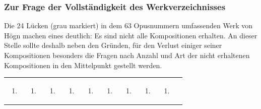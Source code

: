 \documentclass[a4paper]{article}
\begin{document}
\subsubsection{Zur Frage der Vollständigkeit des Werkverzeichnisses}
\label{bkm:Ref98427627}\hypertarget{RefHeadingToc100333741}{}Die 24
Lücken (grau markiert) in dem 63 Opusnummern umfassenden Werk von Högn
machen eines deutlich: Es sind nicht alle Kompositionen erhalten. An
dieser Stelle sollte deshalb neben den Gründen, für den Verlust einiger
seiner Kompositionen besonders die Fragen nach Anzahl und Art der nicht
erhaltenen Kompositionen in den Mittelpunkt gestellt werden.

\begin{center}
\begin{minipage}{8.096cm}
\begin{flushleft}
\tablefirsthead{}
\tablehead{}
\tabletail{}
\tablelasttail{}
\begin{supertabular}{|m{0.60800004cm}|m{0.60800004cm}|m{0.60800004cm}|m{0.60800004cm}|m{0.60800004cm}|m{0.60800004cm}|m{0.60800004cm}|m{0.60800004cm}|m{0.60800004cm}|m{0.626cm}|}
\hline
\begin{enumerate}
\item
\end{enumerate}
 &
\begin{enumerate}
\item
\end{enumerate}
 &
\begin{enumerate}
\item
\end{enumerate}
 &
\begin{enumerate}
\item
\end{enumerate}
 &
\begin{enumerate}
\item
\end{enumerate}
 &
\begin{enumerate}
\item
\end{enumerate}
 &
\begin{enumerate}
\item
\end{enumerate}
 &
\begin{enumerate}
\item
\end{enumerate}
 &
\begin{enumerate}
\item
\end{enumerate}

\end{supertabular}
\end{flushleft}
\end{minipage}
\end{center}
\end{document}
